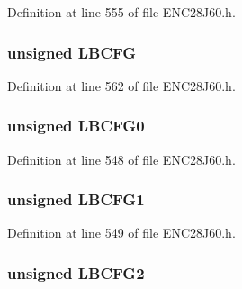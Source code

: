 Definition at line 555 of file E\+N\+C28\+J60.\+h.

\hypertarget{union_p_h_y_r_e_g_ab1f5c2c76d0ea6e0d65533a3dba9b791}{}
\subsubsection[{L\+B\+C\+F\+G}]{\setlength{\rightskip}{0pt plus 5cm}unsigned L\+B\+C\+F\+G}\label{union_p_h_y_r_e_g_ab1f5c2c76d0ea6e0d65533a3dba9b791}


Definition at line 562 of file E\+N\+C28\+J60.\+h.

\hypertarget{union_p_h_y_r_e_g_a3e638535a1eb9b816dad7e4f5528eadd}{}
\subsubsection[{L\+B\+C\+F\+G0}]{\setlength{\rightskip}{0pt plus 5cm}unsigned L\+B\+C\+F\+G0}\label{union_p_h_y_r_e_g_a3e638535a1eb9b816dad7e4f5528eadd}


Definition at line 548 of file E\+N\+C28\+J60.\+h.

\hypertarget{union_p_h_y_r_e_g_a045fa88047268923921d1a39658c5e62}{}
\subsubsection[{L\+B\+C\+F\+G1}]{\setlength{\rightskip}{0pt plus 5cm}unsigned L\+B\+C\+F\+G1}\label{union_p_h_y_r_e_g_a045fa88047268923921d1a39658c5e62}


Definition at line 549 of file E\+N\+C28\+J60.\+h.

\hypertarget{union_p_h_y_r_e_g_adcd1a339e64f80eefeb1ebe5c717272c}{}
\subsubsection[{L\+B\+C\+F\+G2}]{\setlength{\rightskip}{0pt plus 5cm}unsigned L\+B\+C\+F\+G2}\label{union_p_h_y_r_e_g_adcd1a339e64f80eefeb1ebe5c717272c}


